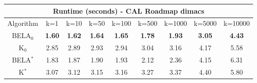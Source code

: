 \begin{tabular}{c|cccccccc}\toprule
\multicolumn{9}{c}{Runtime (seconds) - CAL Roadmap dimacs}\\ \midrule
Algorithm & k=1 & k=10 & k=50 & k=100 & k=500 & k=1000 & k=5000 & k=10000 \\ \midrule
BELA$_0$ & \textbf{1.60} & \textbf{1.62} & \textbf{1.64} & \textbf{1.65} & \textbf{1.78} & \textbf{1.93} & \textbf{3.05} & \textbf{4.43} \\
K$_0$ & 2.85 & 2.89 & 2.93 & 2.94 & 3.04 & 3.16 & 4.17 & 5.58 \\
BELA$^*$ & 1.83 & 1.87 & 1.90 & 1.93 & 2.12 & 2.36 & 4.15 & 6.31 \\
K$^*$ & 3.07 & 3.12 & 3.15 & 3.16 & 3.27 & 3.37 & 4.40 & 5.80 \\ \bottomrule 
\end{tabular}

